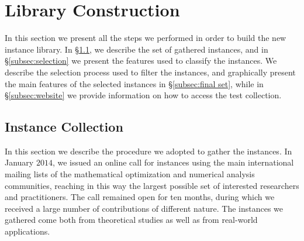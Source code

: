 \section{Library Construction}\label{sec:lib}

In this section we present all the steps we performed in order to build
the new instance library. In \S\ref{subsec:instColl}, we describe the set
of gathered instances, and
in \S\ref{subsec:selection} we present the features used to
classify the instances.
We describe the selection process used to filter the instances, and
graphically present the main features of the selected instances in
\S\ref{subsec:final set}, while in \S\ref{subsec:website}
we provide information on how to access the test collection.

\subsection{Instance Collection}\label{subsec:instColl}

In this section we describe the procedure we adopted to gather the
instances. In January $2014$, we issued an online call for instances
using the main international mailing lists of the mathematical
optimization and numerical analysis communities, reaching in this way
the largest possible set of interested researchers and practitioners.
The call remained open for ten months, during which we received a large
number of contributions of different nature. The instances we gathered
come both from theoretical studies as well as from real-world
applications.


